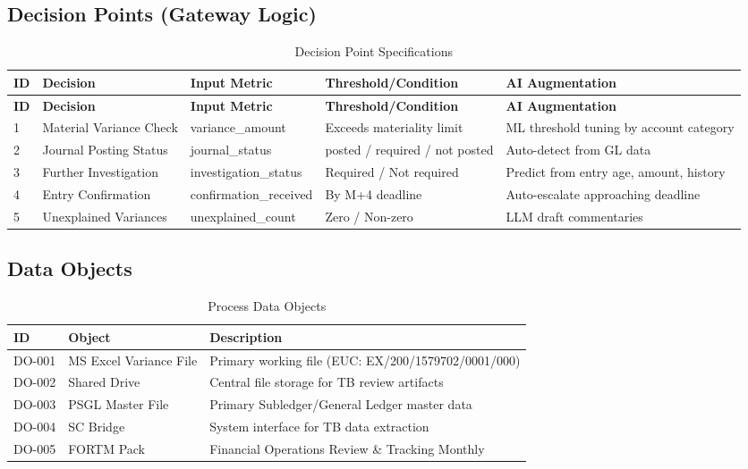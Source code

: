 \documentclass[11pt,a4paper]{article}
\begin{document}
\subsection{Decision Points (Gateway Logic)}

\begin{longtable}{p{0.5cm}p{3.5cm}p{2.5cm}p{2.5cm}p{3.5cm}}
\caption{Decision Point Specifications} \\
\toprule
\textbf{ID} & \textbf{Decision} & \textbf{Input Metric} & \textbf{Threshold/Condition} & \textbf{AI Augmentation} \\
\midrule
\endfirsthead
\toprule
\textbf{ID} & \textbf{Decision} & \textbf{Input Metric} & \textbf{Threshold/Condition} & \textbf{AI Augmentation} \\
\midrule
\endhead
1 & Material Variance Check & variance\_amount & Exceeds materiality limit & ML threshold tuning by account category \\
\midrule
2 & Journal Posting Status & journal\_status & posted / required / not posted & Auto-detect from GL data \\
\midrule
3 & Further Investigation & investigation\_status & Required / Not required & Predict from entry age, amount, history \\
\midrule
4 & Entry Confirmation & confirmation\_received & By M+4 deadline & Auto-escalate approaching deadline \\
\midrule
5 & Unexplained Variances & unexplained\_count & Zero / Non-zero & LLM draft commentaries \\
\bottomrule
\end{longtable}

\subsection{Data Objects}

\begin{table}[H]
\centering
\caption{Process Data Objects}
\begin{tabularx}{\textwidth}{llX}
\toprule
\textbf{ID} & \textbf{Object} & \textbf{Description} \\
\midrule
DO-001 & MS Excel Variance File & Primary working file (EUC: EX/200/1579702/0001/000) \\
DO-002 & Shared Drive & Central file storage for TB review artifacts \\
DO-003 & PSGL Master File & Primary Subledger/General Ledger master data \\
DO-004 & SC Bridge & System interface for TB data extraction \\
DO-005 & FORTM Pack & Financial Operations Review \& Tracking Monthly \\
\bottomrule
\end{tabularx}
\end{table}
\end{document}

